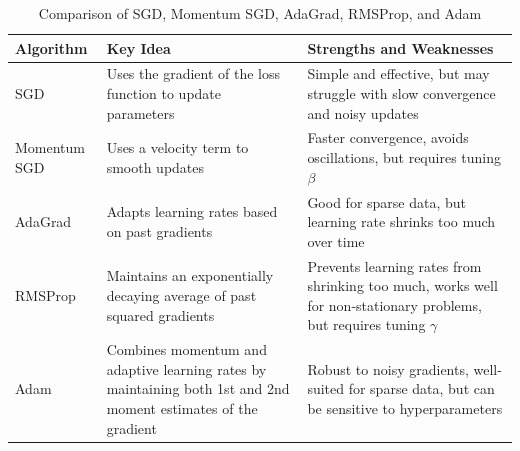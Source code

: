 \begin{table}[h]
\centering
\begin{tabular}{|l|p{4.5cm}|p{5cm}|}
\hline
\textbf{Algorithm} & \textbf{Key Idea} & \textbf{Strengths and Weaknesses} \\
\hline
SGD & Uses the gradient of the loss function to update parameters & Simple and effective, but may struggle with slow convergence and noisy updates \\
\hline
Momentum SGD & Uses a velocity term to smooth updates & Faster convergence, avoids oscillations, but requires tuning $\beta$ \\
\hline
AdaGrad & Adapts learning rates based on past gradients & Good for sparse data, but learning rate shrinks too much over time \\
\hline
RMSProp & Maintains an exponentially decaying average of past squared gradients & Prevents learning rates from shrinking too much, works well for non-stationary problems, but requires tuning $\gamma$ \\
\hline
Adam & Combines momentum and adaptive learning rates by maintaining both 1st and 2nd moment estimates of the gradient & Robust to noisy gradients, well-suited for sparse data, but can be sensitive to hyperparameters \\
\hline
\end{tabular}
\caption{Comparison of SGD, Momentum SGD, AdaGrad, RMSProp, and Adam}
\label{tab:ch5-algorithms-comparison}
\end{table}
